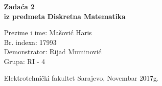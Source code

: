 \documentclass[12pt]{article}
\newcommand{\prezimeIme}{Mašović Haris}
\newcommand{\brIndexa}{17993}
\newcommand{\brZadace}{2}
\begin{document}
    
    \thispagestyle{empty}
    \begin{center}
      \vspace*{1cm}

      \vspace*{2cm}
      {\huge \bf Zadaća \brZadace } \\
      \vspace*{1cm}
      {\Large \bf iz predmeta Diskretna Matematika}

      \vspace*{2cm}

      {\Large Prezime i ime: \prezimeIme} \\
      \vspace*{0.75cm}
      {\Large Br. indexa: \brIndexa} \\
      \vspace*{0.75cm}
      {\Large Demonstrator: Rijad Muminović} \\
      \vspace*{0.75cm}
      {\Large Grupa: RI - 4} \\


      \vfill


      {\large Elektrotehnički fakultet Sarajevo, Novembar 2017g.}

    \end{center}
    \newpage
    \thispagestyle{empty}
    
\end{document}
